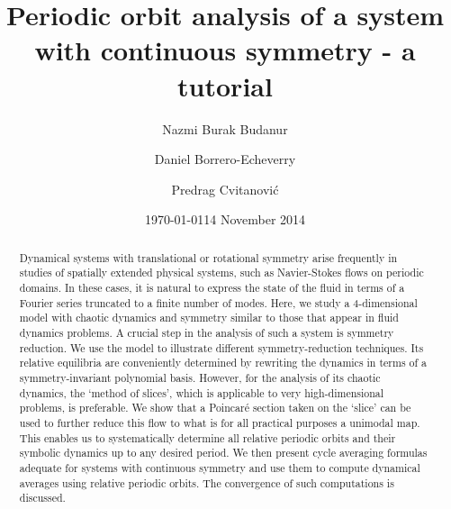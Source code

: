\documentclass[aip,cha,
reprint,
secnumarabic,
nofootinbib, tightenlines,
nobibnotes, showkeys, showpacs,
superscriptaddress,
]{revtex4-1}
\begin{document}
\title[Periodic orbit analysis of a system with continuous symmetry]
{Periodic orbit analysis of a system with continuous symmetry - a tutorial}

\author{Nazmi Burak Budanur}
\author{Daniel Borrero-Echeverry}
\author{Predrag Cvitanovi\'{c}}
    \ifdraft
\date{\today}
    \else
\date{14 November 2014}
   \fi

\begin{abstract}
Dynamical systems with translational or rotational symmetry arise
frequently in studies of spatially extended physical systems, such as
Navier-Stokes flows on periodic domains. In these cases, it is natural to
express the state of the fluid in terms of a Fourier series truncated to a
finite number of modes.
Here, we study a 4-dimensional model with chaotic dynamics and
 symmetry similar to those that appear in fluid dynamics problems.
A crucial step in the analysis of such a system
is symmetry reduction. We use the model to illustrate different
symmetry-reduction techniques. Its relative equilibria are conveniently
determined by rewriting the dynamics in terms of a symmetry-invariant
polynomial basis. However, for the analysis of its chaotic dynamics, the `method of
slices', which is applicable to very high-dimensional problems, is
preferable. We show that a Poincar\'e section taken on the `slice' can be
used to further reduce this flow to what is for all practical purposes a
unimodal map. This enables us to systematically determine all relative
periodic orbits and their symbolic dynamics up to any desired period. We
then present cycle averaging formulas adequate for systems with continuous symmetry
and use them to compute dynamical averages using relative periodic orbits. The convergence
of such computations is discussed.
\end{abstract}

\maketitle
\end{document}
